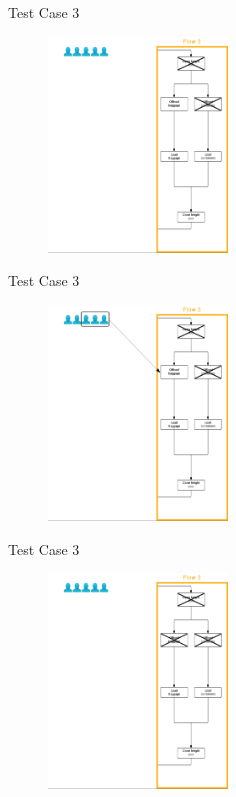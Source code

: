 \begin{frame}{Test Case 3}
\begin{figure}
    \centering
    \includegraphics[width=180px]{Grafik/Flow3/Flow3-2-1}
\end{figure}
\end{frame}

\begin{frame}{Test Case 3}
\begin{figure}
    \centering
    \includegraphics[width=180px]{Grafik/Flow3/Flow3-2}
\end{figure}
\end{frame}

\begin{frame}{Test Case 3}
\begin{figure}
    \centering
    \includegraphics[width=180px]{Grafik/Flow3/Flow3-3-1}
\end{figure}
\end{frame}

